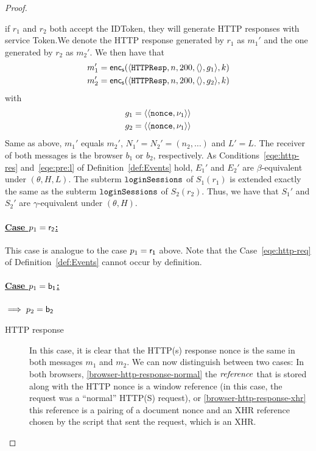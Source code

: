 \begin{theorem}
\begin{proof}
\begin{itemize}
        if $r_1$ and $r_2$ both accept the IDToken, they will 
        generate HTTP responses with service Token.We denote 
        the HTTP response generated by $r_1$ as $m_1'$ and the
        one generated by $r_2$ as $m_2'$. We then have that
        \begin{align*}
          m_1' = \mathsf{enc}_\mathsf{s}(\langle\mathtt{HTTPResp},n,200,\langle\rangle,g_1\rangle,k) \\
          m_2' = \mathsf{enc}_\mathsf{s}(\langle\mathtt{HTTPResp},n,200,\langle\rangle,g_2\rangle,k)
        \end{align*}
        with
        \begin{align*}
          g_1 = \langle\langle\mathtt{nonce}, \nu_1\rangle\rangle \\
          g_2 = \langle\langle\mathtt{nonce}, \nu_1\rangle\rangle
        \end{align*}
        Same as above, $m_1'$ equals $m_2'$, $N_1' = N_2' = 
        (n_2, \dots)$ and $L' = L$. 
        The receiver of both messages is the browser $b_1$ or 
        $b_2$, respectively. As Conditions~\ref{eqe:http-res} 
        and~\ref{eqe:pre:l} of Definition~\ref{def:Events} hold, 
        $E_1'$ and $E_2'$ are $\beta$-equivalent under 
        $(\theta,H,L)$. The subterm $\mathtt{loginSessions}$ of 
        $S_1(r_1)$ is extended exactly the same as the subterm 
        $\mathtt{loginSessions}$ of $S_2(r_2)$. Thus, we have that 
        $S_1'$ and $S_2'$ are $\gamma$-equivalent under 
        $(\theta,H)$.
    \end{itemize}
  
    \paragraph{\underline{Case $p_1 = \mathsf{r_2}$:}} This case is
    analogue to the case $p_1 = \mathsf{r_1}$ above. Note that the
    Case~\ref{eqe:http-req} of Definition~\ref{def:Events} 
    cannot occur by definition.
  
    \paragraph{\underline{Case $p_1 = \mathsf{b_1}$:}} 
    $\implies p_2 = \mathsf{b_2}$ 
  
  
    \begin{description}
      \item[HTTP response]\label{proof:http-response} In this case, it is clear that
        the HTTP(s) response nonce is the same in both
        messages $m_1$ and $m_2$. 
        We can now distinguish between two cases: 
        In both browsers, \ref{browser-http-response-normal}
        the $\mathit{reference}$ that is stored along with the HTTP 
        nonce is a window reference (in this case, the request 
        was a ``normal'' HTTP(S) request), 
        or \ref{browser-http-response-xhr} this reference is a 
        pairing of a document nonce and an XHR reference chosen 
        by the script that sent the request, which is an XHR.
        

\end{description}
\end{proof}
\end{theorem}
